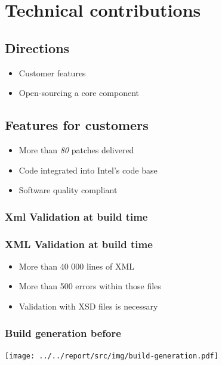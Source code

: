 %
%

\section{Technical contributions}
\subsection{Directions}
\begin{FrameWithSubSection}
    \begin{itemize}
        \item Customer features
        \item Open-sourcing a core component
    \end{itemize}
\end{FrameWithSubSection}


\subsection{Features for customers}
\begin{FrameWithSubSection}
    \begin{itemize}
        \item More than \emph{80} patches delivered
        \item Code integrated into Intel's code base
        \item Software quality compliant
    \end{itemize}
\end{FrameWithSubSection}

\subsubsection{Xml Validation at build time}
\begin{frame}
    \frametitle{XML Validation at build time}
    \begin{itemize}
        \item More than 40 000 lines of XML
        \item More than 500 errors within those files
        \item Validation with XSD files is necessary
    \end{itemize}
\end{frame}

\begin{frame}
    \frametitle{Build generation before}
    \centering
    \texttt{[image: ../../report/src/img/build-generation.pdf]}
\end{frame}

